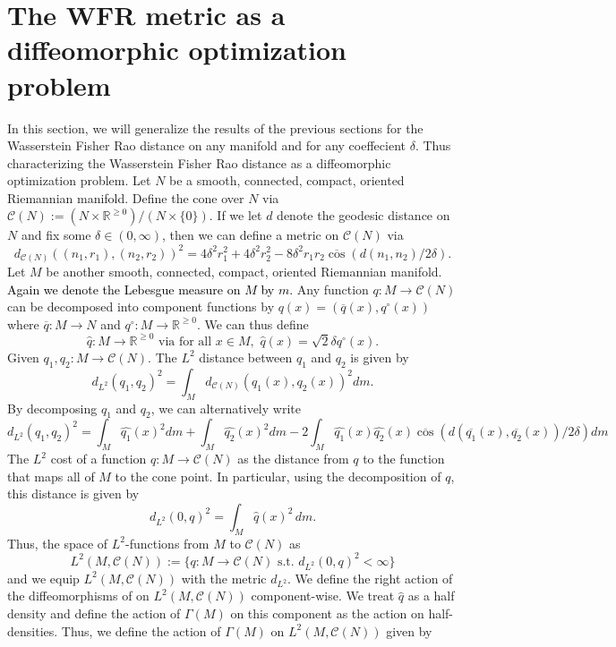 \documentclass[final,hidelinks,onefignum,onetabnum]{siamart220329}
\newcommand{\R}{\mathbb{R}}
\begin{document}
\section{The WFR metric as a diffeomorphic optimization problem}
In this section, we will generalize the results of the previous sections for the Wasserstein Fisher Rao distance on any manifold and for any coeffecient $\delta$. Thus characterizing the Wasserstein Fisher Rao distance as a diffeomorphic optimization problem. Let $N$ be a smooth, connected, compact, oriented Riemannian manifold. Define the cone over $N$ via
$\mathcal{C}(N):= (N\times \R^{\geq0})/(N\times\{0\})$. If we let $d$ denote the geodesic distance on $N$ and fix some $\delta \in (0,\infty)$, then we can define a metric on $\mathcal{C}(N)$ via
\[d_{\mathcal{C}(N)}((n_1,r_1),(n_2,r_2))^2=4\delta^2r_1^2+4\delta^2r_2^2-8\delta^2r_1r_2 \overline{\cos}(d(n_1,n_2)/2\delta).\]
Let $M$ be another smooth, connected, compact, oriented Riemannian manifold. \textcolor{black}{Again we denote the Lebesgue measure on $M$ by $m$.} Any function $q:M\to \mathcal{C}(N)$  can be decomposed into component functions by $q(x)=(\overline{q}(x),q^\circ(x))$ where $\overline{q}:M\to N$ and $q^\circ:M\to \R^{\geq0}$. We can thus define \[\hat{q}:M\to\R^{\geq0}\text{ via  for all }x\in M,\,\,\hat{q}(x)=\sqrt{2}\delta q^\circ(x).\]
Given $q_1,q_2:M\to\mathcal{C}(N)$. The $L^2$ distance between $q_1$ and $q_2$ is given by \[d_{L^2}(q_1,q_2)^2=\int_M d_{\mathcal{C}(N)}(q_1(x),q_2(x))^2 dm.\]
By decomposing $q_1$ and $q_2$, we can alternatively write 
\begin{equation}
    d_{L^2}(q_1,q_2)^2=\int_M \hat{q_1}(x)^2 dm +\int_M \hat{q_2}(x)^2 dm -2\int_M \hat{q_1}(x)\hat{q_2}(x)\overline{\cos}(d(\overline{q_1}(x),\overline{q_2}(x))/2\delta)dm
\end{equation}
The $L^2$ cost of a function $q:M\to \mathcal{C}(N)$ as the distance from $q$ to the function that maps all of $M$ to the cone point. In particular, using the decomposition of $q$, this distance is given by \[d_{L^2}(0,q)^2 = \int_M \hat{q}(x)^2 \,dm.\] Thus, the space of $L^2$-functions from $M$ to $\mathcal{C}(N)$ as \[L^2(M,\mathcal{C}(N)):=\{q:M\to \mathcal{C}(N) \text{ s.t. } d_{L^2}(0,q)^2<\infty\}\] 
and we equip $L^2(M,\mathcal{C}(N))$ with the metric $d_{L^2}$. We define the right action of the diffeomorphisms of on $L^2(M,\mathcal{C}(N))$ component-wise. We treat $\hat{q}$ as a half density and define the action of $\Gamma(M)$ on this component as the action on half-densities. Thus, we define the action of $\Gamma(M)$ on $L^2(M,\mathcal{C}(N))$ given by
\end{document}
